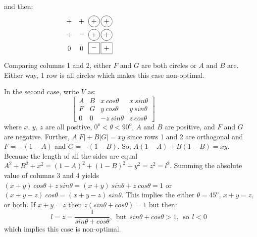 and then:
\begin{equation*}
\myarrset
\begin{array}{ccccccccc}
\ndcp & \ndcp & \dcp  & \dcp  \\
\ndcp & \ndcm & \dcp  & \dcp  \\
\ndcz & \ndcz & \dsm  & \dsp
\end{array}
~~~~~~~~~~~~~~~~~~~~~~~~~~~~~~~~~~~
\end{equation*}
Comparing columns 1 and 2, either $F$ and $G$ are both circles or $A$ and $B$
are.  Either way, 1 row is all circles which makes this case non-optimal.

In the second case, write $V$ as:
\begin{equation*}
\left[
\begin{array}{rrrr}
A & B &  x~cos\theta & x~sin\theta \\
F & G &  y~cos\theta & y~sin\theta \\
0 & 0 & -z~sin\theta & z~cos\theta
\end{array}
\right]
~~~~~~~~~~~~~~~~~~~~
\end{equation*}
where $x$, $y$, $z$ are all positive, $0^o < \theta < 90^o$, $A$ and $B$ are
positive, and $F$ and $G$ are negative.  Further, $A|F|+B|G| = x y$ since rows
1 and 2 are orthogonal and $F = -(1-A)$ and $G = -(1-B)$.  So, $A(1-A) +
B(1-B) = x y$.  Because the length of all the sides are equal $A^2 + B^2 + x^2
= (1-A)^2 + (1-B)^2 + y^2 = z^2 = l^2$. Summing the absolute value of columns
3 and 4 yields $(x+y)~cos\theta + z~sin\theta = (x+y)~sin\theta + z~cos\theta
= 1$ or $(x+y-z)~cos\theta = (x+y-z)~sin\theta$.  This implies the either
$\theta = 45^o$, $x+y=z$, or both. If $x+y=z$ then $z(sin\theta + cos\theta) =
1$ but then:
\begin{equation*}
l = z = \frac{1}{sin\theta + cos\theta},
~~\text{but}~~ sin\theta + cos\theta > 1,
~~\text{so}~~ l < 0
\end{equation*}
which implies this case is non-optimal.

